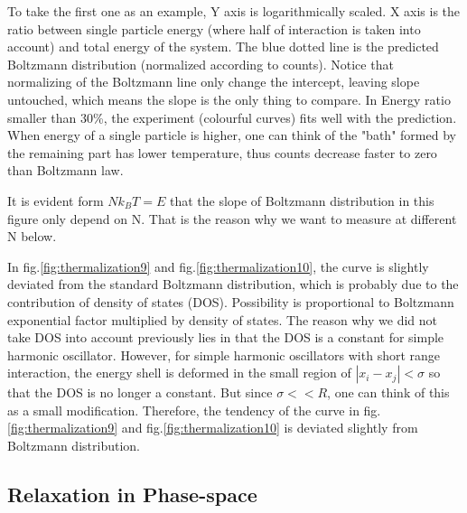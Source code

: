 \documentclass[aps,pre,twocolumn,groupedaddress]{revtex4-1}
\begin{document}
To take the first one as an example, Y axis is logarithmically scaled. X axis is the ratio between single particle energy (where half of interaction is taken into account) and total energy of the system. The blue dotted line is the predicted Boltzmann distribution (normalized according to counts). Notice that normalizing of the Boltzmann line only change the intercept, leaving slope untouched, which means the slope is the only thing to compare. In  Energy ratio smaller than 30\%, the experiment (colourful curves) fits well with the prediction. When energy of a single particle is higher, one can think of the "bath" formed by the remaining part has lower temperature, thus counts decrease faster to zero than Boltzmann law.

It is evident form $Nk_BT=E$ that the slope of Boltzmann distribution in this figure only depend on N. That is the reason why we want to measure at different N below. 

In fig.\ref{fig:thermalization9} and fig.\ref{fig:thermalization10}, the curve is slightly deviated from the standard Boltzmann distribution, which is probably due to the contribution of density of states (DOS). Possibility is proportional to Boltzmann exponential factor multiplied by density of states. The reason why we did not take DOS into account previously lies in that the DOS is a constant for simple harmonic oscillator. However, for simple harmonic oscillators with short range interaction, the energy shell is deformed in the small region of $|x_i-x_j|<\sigma$ so that the DOS is no longer a constant. But since $\sigma<<R$, one can think of this as a small modification. Therefore, the tendency of the curve in fig.\ref{fig:thermalization9} and fig.\ref{fig:thermalization10} is deviated slightly from Boltzmann distribution.
 


\subsection{Relaxation in Phase-space}
\end{document}
